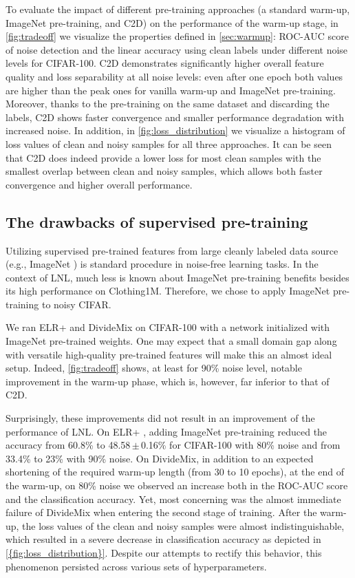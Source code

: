 \documentclass[10pt,twocolumn,letterpaper]{article}
\renewcommand{\cite}[1]{\citep{#1}}
\newcommand{\eb}[1]{{\scriptsize\,$\pm$\,#1}}
\begin{document}
To evaluate the impact of different pre-training approaches (a standard warm-up, ImageNet pre-training, and C2D) on the performance of the warm-up stage,  in \cref{fig:tradeoff} we visualize the properties defined in \cref{sec:warmup}: ROC-AUC score of noise detection and the linear accuracy using clean labels under different noise levels for CIFAR-100. 
C2D demonstrates significantly higher overall feature quality and loss separability at all noise levels: even after one epoch both values are higher than the peak ones for vanilla warm-up and ImageNet pre-training. Moreover, thanks to the pre-training on the same dataset and discarding the labels, C2D shows faster convergence and smaller performance degradation with increased noise.
In addition,  in \cref{fig:loss_distribution} we visualize a histogram of loss values of clean and noisy samples for all three approaches. It can be seen that  C2D does indeed provide a lower loss for most clean samples with the smallest overlap between clean and noisy samples, which allows both faster convergence and higher overall performance.


\subsection{The drawbacks of supervised pre-training}
\label{subsec:super_comparison}



Utilizing supervised pre-trained features from large cleanly labeled data source (e.g., ImageNet \cite{alex2019bit}) is standard procedure in noise-free learning tasks. In the context of LNL, much less is known about ImageNet pre-training benefits besides its high performance on Clothing1M. Therefore,  we chose to apply ImageNet pre-training to noisy CIFAR.  


We ran ELR+ and DivideMix on CIFAR-100 with a network initialized with ImageNet pre-trained weights. 
One may expect that a small domain gap along with versatile high-quality pre-trained features will make this an almost ideal setup.  Indeed,  \cref{fig:tradeoff} shows, at least for 90\% noise level, notable improvement in the warm-up phase, which is, however, far inferior to that of C2D.

Surprisingly, these improvements did not result in an improvement of the performance of LNL.
On ELR+ \cite{liu2020earlylearning},  adding ImageNet pre-training reduced the accuracy from 60.8\% to 48.58\eb{0.16}\% for CIFAR-100 with 80\% noise and from 33.4\% to 23\% with 90\% noise.
On DivideMix, in addition to an expected shortening of the required warm-up length (from 30 to 10 epochs), at the end of the warm-up, on 80\% noise we observed an increase both in the ROC-AUC score 
and the classification accuracy. Yet, most concerning was the almost immediate failure of DivideMix when entering the second stage of training.
After the warm-up, the loss values of the clean and noisy samples were almost indistinguishable, which resulted in a severe decrease in classification accuracy as depicted in \cref{{fig:loss_distribution}}. Despite our attempts to rectify this behavior, this phenomenon persisted across various sets of hyperparameters.
\end{document}
